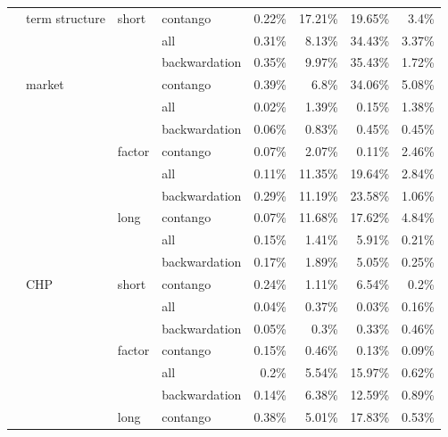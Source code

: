 \documentclass[]{elsarticle} %
\begin{document}
\begin{longtable}[t]{>{}llllrrrr}
\nopagebreak
\multirow[t]{-30}{*}{\raggedright\arraybackslash \textbf{CHP}} & \multirow[t]{-9}{*}{\raggedright\arraybackslash term structure} & \multirow[t]{-3}{*}{\raggedright\arraybackslash short} & contango & 0.22\% & 17.21\% & 19.65\% & 3.4\%\\
\cmidrule{1-8}\pagebreak[0]
 &  &  & all & 0.31\% & 8.13\% & 34.43\% & 3.37\%\\
\nopagebreak
 &  &  & backwardation & 0.35\% & 9.97\% & 35.43\% & 1.72\%\\
\nopagebreak
 & \multirow[t]{-3}{*}{\raggedright\arraybackslash market} &  & contango & 0.39\% & 6.8\% & 34.06\% & 5.08\%\\
\nopagebreak
 &  &  & all & 0.02\% & 1.39\% & 0.15\% & 1.38\%\\
\nopagebreak
 &  &  & backwardation & 0.06\% & 0.83\% & 0.45\% & 0.45\%\\
\nopagebreak
 &  & \multirow[t]{-6}{*}{\raggedright\arraybackslash factor} & contango & 0.07\% & 2.07\% & 0.11\% & 2.46\%\\
\nopagebreak
 &  &  & all & 0.11\% & 11.35\% & 19.64\% & 2.84\%\\
\nopagebreak
 &  &  & backwardation & 0.29\% & 11.19\% & 23.58\% & 1.06\%\\
\nopagebreak
 &  & \multirow[t]{-3}{*}{\raggedright\arraybackslash long} & contango & 0.07\% & 11.68\% & 17.62\% & 4.84\%\\
\nopagebreak
 &  &  & all & 0.15\% & 1.41\% & 5.91\% & 0.21\%\\
\nopagebreak
 &  &  & backwardation & 0.17\% & 1.89\% & 5.05\% & 0.25\%\\
\nopagebreak
 & \multirow[t]{-9}{*}{\raggedright\arraybackslash CHP} & \multirow[t]{-3}{*}{\raggedright\arraybackslash short} & contango & 0.24\% & 1.11\% & 6.54\% & 0.2\%\\
\nopagebreak
 &  &  & all & 0.04\% & 0.37\% & 0.03\% & 0.16\%\\
\nopagebreak
 &  &  & backwardation & 0.05\% & 0.3\% & 0.33\% & 0.46\%\\
\nopagebreak
 &  & \multirow[t]{-3}{*}{\raggedright\arraybackslash factor} & contango & 0.15\% & 0.46\% & 0.13\% & 0.09\%\\
\nopagebreak
 &  &  & all & 0.2\% & 5.54\% & 15.97\% & 0.62\%\\
\nopagebreak
 &  &  & backwardation & 0.14\% & 6.38\% & 12.59\% & 0.89\%\\
\nopagebreak
 &  & \multirow[t]{-3}{*}{\raggedright\arraybackslash long} & contango & 0.38\% & 5.01\% & 17.83\% & 0.53\%\\

\end{longtable}
\end{document}
